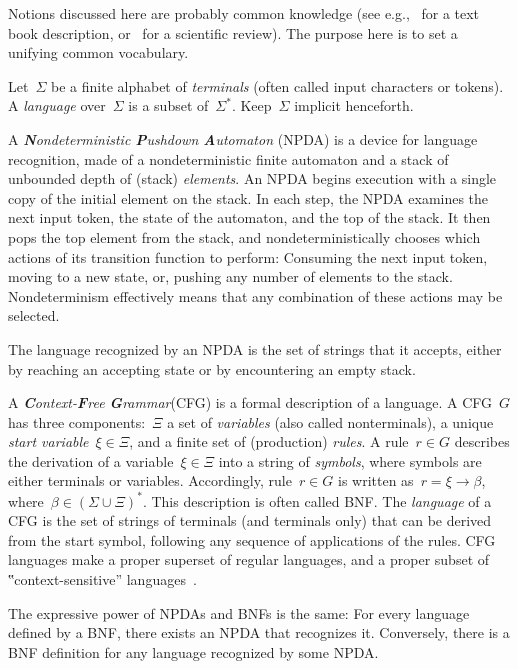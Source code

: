 Notions discussed here are probably common knowledge
 (see e.g.,~\cite{Hopcroft:book:2001,Linz:2001} for a text book description,
 or~\cite{Autebert:97} for a scientific review).
The purpose here is to set a unifying common vocabulary.

Let~$Σ$ be a finite alphabet of \emph{terminals} (often called input characters or tokens).
A \emph{language} over~$Σ$
  is a subset of~$Σ^*$.
Keep~$Σ$ implicit henceforth.

A \emph{\textbf Nondeterministic \textbf Pushdown \textbf Automaton} (NPDA) is a device for language recognition,
  made of a nondeterministic finite automaton
  and a stack of unbounded depth of (stack) \emph{elements}.
An NPDA begins execution with a single copy of the initial element on the stack.
In each step, the NPDA
  examines the next input token,
  the state of the automaton,
  and the top of the stack.
It then pops the top element from the stack, and nondeterministically chooses which actions of
  its transition function to perform:
  Consuming the next input token,
  moving to a new state,
  or, pushing any number of elements to the stack.
Nondeterminism effectively means
  that any combination of these actions may be selected.

The language recognized by an NPDA is the set of strings that it accepts,
  either by reaching an accepting state or by encountering an empty stack.

A \emph{\textbf Context-\textbf Free \textbf Grammar}(CFG) is a formal description of a language.
A CFG~$G$ has three components:~$Ξ$ a set of \emph{variables} (also called nonterminals),
  a unique \emph{start variable}~$ξ∈Ξ$, and a finite set of (production) \emph{rules}.
A rule~$r∈G$ describes the derivation of a variable~$ξ∈Ξ$ into
  a string of \emph{symbols}, where symbols are either terminals or variables.
Accordingly, rule~$r∈G$ is written as~$r=ξ→β$, where~$β∈\left(Σ∪Ξ\right)^*$.
This description is often called BNF\@.
The \emph{language} of a CFG is the set of strings of terminals (and terminals only)
  that can be derived from the start symbol, following any sequence of applications of the rules.
CFG languages make a proper superset of regular languages, and a proper subset of 
  ‟context-sensitive” languages~\cite{Hopcroft:79}.

The expressive power of NPDAs and BNFs is the same:
  For every language defined by a BNF, there exists an NPDA that recognizes it.
Conversely, there is a BNF definition for any language recognized by some NPDA.

